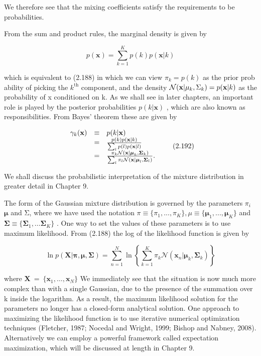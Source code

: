 \documentclass[
  10
]{article}
\begin{document}
We therefore see that the mixing coefficients satisfy the requirements
to be probabilities.

From the sum and product rules, the marginal density is given by

\[
p (\mathbf {x}) = \sum_ {k = 1} ^ {K} p (k) p (\mathbf {x} | k)\tag{2.191}
\]

which is equivalent to (2.188) in which we can view
\(\pi _ { k } = p ( k )\) as the prior prob ability of picking the
\(k ^ { \mathrm { t h } }\) component, and the density
\(\mathcal { N } ( { \bf x } | \mu _ { k } , \Sigma _ { k } ) = p ( { \bf x } | k )\)
as the probability of x conditioned on k. As we shall see in later
chapters, an important role is played by the posterior probabilities
\(p ( k | \mathbf { x } )\) , which are also known as responsibilities.
From Bayes' theorem these are given by

\[
\begin{array}{r c l} \gamma_ {k} (\mathbf {x}) & \equiv & p (k | \mathbf {x}) \\ & = & \frac {p (k) p (\mathbf {x} | k)}{\sum_ {l} p (l) p (\mathbf {x} | l)} \\ & = & \frac {\pi_ {k} \mathcal {N} (\mathbf {x} | \boldsymbol {\mu} _ {k} , \boldsymbol {\Sigma} _ {k})}{\sum_ {l} \pi_ {l} \mathcal {N} (\mathbf {x} | \boldsymbol {\mu} _ {l} , \boldsymbol {\Sigma} _ {l})}. \end{array}\tag{2.192}
\]

We shall discuss the probabilistic interpretation of the mixture
distribution in greater detail in Chapter 9.

The form of the Gaussian mixture distribution is governed by the
parameters \(\pi _ { i }\) \(\pmb { \mu }\) and Σ, where we have used
the notation
\(\pi \equiv \{ \pi _ { 1 } , . . . , \pi _ { K } \} , \mu \equiv \{ \pmb { \mu } _ { 1 } , . . . , \pmb { \mu } _ { K } \}\)
and
\(\pmb { \Sigma } \equiv \{ \pmb { \Sigma } _ { 1 } , \ldots \pmb { \Sigma } _ { K } \}\)
. One way to set the values of these parameters is to use maximum
likelihood. From (2.188) the log of the likelihood function is given by

\[
\ln p (\mathbf {X} | \boldsymbol {\pi}, \boldsymbol {\mu}, \boldsymbol {\Sigma}) = \sum_ {n = 1} ^ {N} \ln \left\{\sum_ {k = 1} ^ {K} \pi_ {k} \mathcal {N} (\mathbf {x} _ {n} | \boldsymbol {\mu} _ {k}, \boldsymbol {\Sigma} _ {k}) \right\}\tag{2.193}
\]

where
\(\mathbf { X } ~ = ~ \{ \mathbf { x } _ { 1 } , \ldots , \mathbf { x } _ { N } \}\)
We immediately see that the situation is now much more complex than with
a single Gaussian, due to the presence of the summation over k inside
the logarithm. As a result, the maximum likelihood solution for the
parameters no longer has a closed-form analytical solution. One approach
to maximizing the likelihood function is to use iterative numerical
optimization techniques (Fletcher, 1987; Nocedal and Wright, 1999;
Bishop and Nabney, 2008). Alternatively we can employ a powerful
framework called expectation maximization, which will be discussed at
length in Chapter 9.
\end{document}
